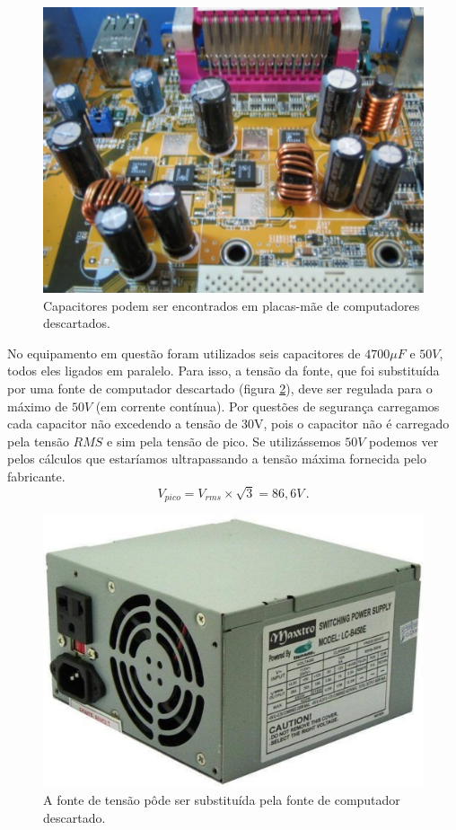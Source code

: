 \documentclass[
	12pt,				%
	openright,			%
	oneside,			%
	a4paper,			%
	english,			%
	spanish,			%
	brazil,				%
	]{abntex2}
\begin{document}
\begin{figure}[H]
	\centering
	\includegraphics[scale=0.7]{figuras/capacitores.pdf}
	\caption{Capacitores podem ser encontrados em placas-mãe de computadores descartados.}  \label{fig:capacitores} 
\end{figure}

No equipamento em questão foram utilizados seis capacitores de $4700 \mu F$ e $50V$, todos eles ligados em paralelo. Para isso, a tensão da fonte, que foi substituída por uma fonte de computador descartado (figura \ref{fig:fonte}), deve ser regulada para o máximo de $50V$ (em corrente contínua). Por questões de segurança carregamos cada capacitor não excedendo a tensão de 30V, pois o capacitor não é carregado pela tensão $RMS$ e sim pela tensão de pico. Se utilizássemos $50V$ podemos ver pelos cálculos que estaríamos ultrapassando a tensão máxima fornecida pelo fabricante.
$$V_{pico} = V_{rms}\times \sqrt{3} = 86,6 V\,.$$
%
\begin{figure}[H]
	\centering
	\includegraphics[scale=0.4]{figuras/fonte.pdf}
	\caption{A fonte de tensão pôde ser substituída pela fonte de computador descartado.}  \label{fig:fonte} 
\end{figure}
\end{document}
